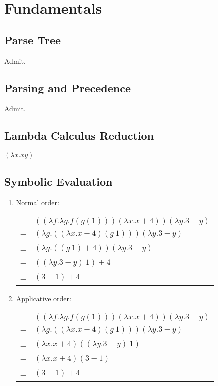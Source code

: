 \chapter{Fundamentals}

\section{Parse Tree}
Admit.


\section{Parsing and Precedence}
Admit.


\section{Lambda Calculus Reduction}
$(\lambda x.xy)$


\section{Symbolic Evaluation}
\begin{enumerate}
  \item Normal order: \\
  \begin{tabular}{rl}
      & $((\lambda f.\lambda g.f(g(1)))(\lambda x.x+4))(\lambda y.3-y)$ \\
    = & $(\lambda g.((\lambda x.x+4)(g\ 1)))(\lambda y.3-y) $ \\
    = & $(\lambda g.((g\ 1)+4))(\lambda y.3-y) $ \\
    = & $((\lambda y.3-y)\ 1)+4$ \\
    = & $(3-1)+4$ \\
  \end{tabular}

  \item Applicative order: \\
  \begin{tabular}{rl}
      & $((\lambda f.\lambda g.f(g(1)))(\lambda x.x+4))(\lambda y.3-y)$ \\
    = & $(\lambda g.((\lambda x.x+4)(g\ 1)))(\lambda y.3-y) $ \\
    = & $(\lambda x.x+4)((\lambda y.3-y)\ 1)$ \\
    = & $(\lambda x.x+4)(3-1)$ \\
    = & $(3-1)+4$ \\
  \end{tabular}
\end{enumerate}


